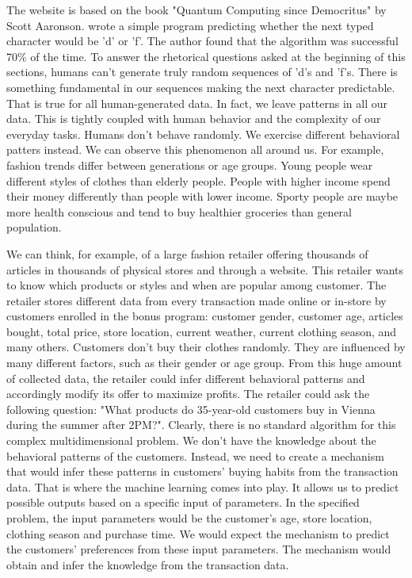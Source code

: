 \documentclass{BachelorBUI}
\begin{document}
        The website is based on the book "Quantum Computing since Democritus" by Scott Aaronson. \textcite{Aaronson:2013} wrote a simple program predicting whether the next typed character would be 'd' or 'f'. The author found that the algorithm was successful 70\% of the time. To answer the rhetorical questions asked at the beginning of this sections, humans can't generate truly random sequences of 'd's and 'f's. There is something fundamental in our sequences making the next character predictable. That is true for all human-generated data. In fact, we leave patterns in all our data. This is tightly coupled with human behavior and the complexity of our everyday tasks. Humans don't behave randomly. We exercise different behavioral patters instead. We can observe this phenomenon all around us. For example, fashion trends differ between generations or age groups. Young people wear different styles of clothes than elderly people. People with higher income spend their money differently than people with lower income. Sporty people are maybe more health conscious and tend to buy healthier groceries than general population. 
        
        We can think, for example, of a large fashion retailer offering thousands of articles in thousands of physical stores and through a website. This retailer wants to know which products or styles and when are popular among customer. The retailer stores different data from every transaction made online or in-store by customers enrolled in the bonus program: customer gender, customer age, articles bought, total price, store location, current weather, current clothing season, and many others. Customers don't buy their clothes randomly. They are influenced by many different factors, such as their gender or age group. From this huge amount of collected data, the retailer could infer different behavioral patterns and accordingly modify its offer to maximize profits. The retailer could ask the following question: "What products do 35-year-old customers buy in Vienna during the summer after 2PM?". Clearly, there is no standard algorithm for this complex multidimensional problem. We don't have the knowledge about the behavioral patterns of the customers. Instead, we need to create a mechanism that would infer these patterns in customers' buying habits from the transaction data. That is where the machine learning comes into play. It allows us to predict possible outputs based on a specific input of parameters. In the specified problem, the input parameters would be the customer's age, store location, clothing season and purchase time. We would expect the mechanism to predict the customers' preferences from these input parameters. The mechanism would obtain and infer the knowledge from the transaction data.
\end{document}
